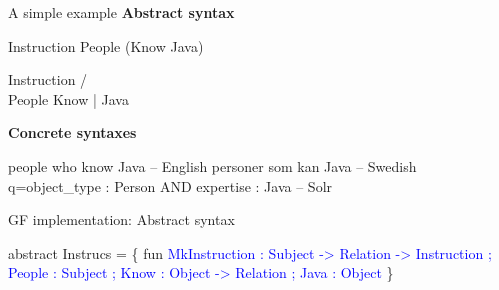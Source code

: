 \begin{frame}[fragile]{A simple example}
\textbf{Abstract syntax}
\begin{semiverbatim}
Instruction People (Know Java)

    Instruction
   /           \\
People        Know
                |
              Java
\end{semiverbatim}\pause


\textbf{Concrete syntaxes}
\begin{semiverbatim}
people who know Java                           -- English
personer som kan Java                          -- Swedish
q=object_type : Person AND expertise : Java    -- Solr
\end{semiverbatim}
\end{frame}

\begin{frame}[fragile]{GF implementation: Abstract syntax}\pause
\begin{semiverbatim}
abstract Instrucs = \{
 fun \textcolor{Blue}{
    MkInstruction : Subject -> Relation -> Instruction ;
    People : Subject ;
    Know : Object -> Relation ;
    Java : Object }
\}
\end{semiverbatim}
\end{frame}

